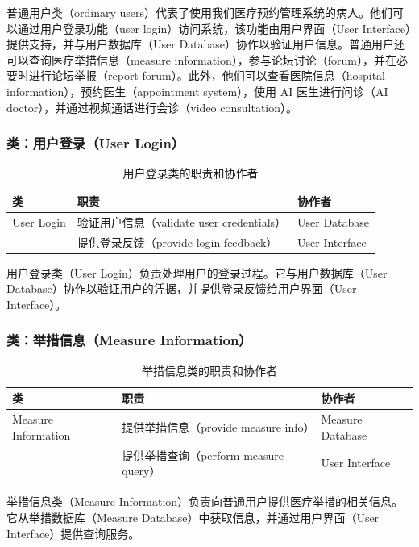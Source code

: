 普通用户类（ordinary users）代表了使用我们医疗预约管理系统的病人。他们可以通过用户登录功能（user login）访问系统，该功能由用户界面（User Interface）提供支持，并与用户数据库（User Database）协作以验证用户信息。普通用户还可以查询医疗举措信息（measure information），参与论坛讨论（forum），并在必要时进行论坛举报（report forum）。此外，他们可以查看医院信息（hospital information），预约医生（appointment system），使用 AI 医生进行问诊（AI doctor），并通过视频通话进行会诊（video consultation）。

\subsubsection{类：用户登录（User Login）}
\begin{table}[htbp]
	\centering
	\begin{tabular}{|l|l|l|}
		\hline
		\textbf{类} & \textbf{职责} & \textbf{协作者} \\
		\hline
		User Login & 验证用户信息（validate user credentials） & User Database \\
		& 提供登录反馈（provide login feedback） & User Interface \\
		\hline
	\end{tabular}
	\caption{用户登录类的职责和协作者}
	\label{tab:user_login}
\end{table}

用户登录类（User Login）负责处理用户的登录过程。它与用户数据库（User Database）协作以验证用户的凭据，并提供登录反馈给用户界面（User Interface）。

\subsubsection{类：举措信息（Measure Information）}
\begin{table}[htbp]
	\centering
	\begin{tabular}{|l|l|l|}
		\hline
		\textbf{类} & \textbf{职责} & \textbf{协作者} \\
		\hline
		Measure Information & 提供举措信息（provide measure info） & Measure Database \\
		& 提供举措查询（perform measure query） & User Interface \\
		\hline
	\end{tabular}
	\caption{举措信息类的职责和协作者}
	\label{tab:measure_information}
\end{table}

举措信息类（Measure Information）负责向普通用户提供医疗举措的相关信息。它从举措数据库（Measure Database）中获取信息，并通过用户界面（User Interface）提供查询服务。

